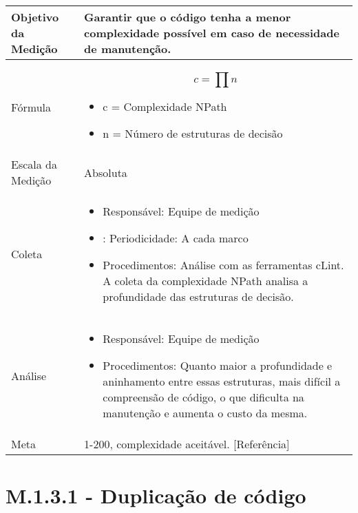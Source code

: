 	\begin{tabular}{ |p{4cm}|p{8cm}|  }
	 \hline
	 Objetivo da Medição 		& 	  Garantir que o código tenha a menor complexidade possível em caso de necessidade de manutenção. \\
	 \hline
	 Fórmula		& 		\[ c = \prod{n} \] \begin{itemize} \item c = Complexidade NPath 
	 \item n = Número de estruturas de decisão \end{itemize}\\
	 \hline
	 Escala da Medição 		& 		Absoluta \\
	 \hline
	 Coleta		& 		\begin{itemize} \item Responsável: Equipe de medição \item: Periodicidade: A cada marco \item Procedimentos: Análise com as ferramentas cLint. A coleta da complexidade NPath analisa a profundidade das estruturas de decisão. \end{itemize} \\
	 \hline
	 Análise		& 		\begin{itemize} \item Responsável: Equipe de medição \item Procedimentos: Quanto maior a profundidade e aninhamento entre essas estruturas, mais difícil a compreensão de código, o que dificulta na manutenção e aumenta o custo da mesma. \end{itemize} \\
	 \hline
	 Meta		& 	1-200, complexidade aceitável. [Referência]	 \\
	 \hline
	\end{tabular}


\section{M.1.3.1 - Duplicação de código} 

